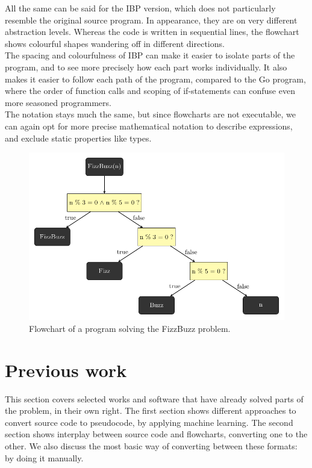 All the same can be said for the IBP version, which does not particularly resemble the original source program. In appearance, they are on very different abstraction levels. Whereas the code is written in sequential lines, the flowchart shows colourful shapes wandering off in different directions. \\

The spacing and colourfulness of IBP can make it easier to isolate parts of the program, and to see more precisely how each part works individually. It also makes it easier to follow each path of the program, compared to the Go program, where the order of function calls and scoping of if-statements can confuse even more seasoned programmers. \\

The notation stays much the same, but since flowcharts are not executable, we can again opt for more precise mathematical notation to describe expressions, and exclude static properties like types.

\begin{figure}[ht]
    \centering
    \includegraphics[scale=.75]{assets/chapter3/FizzBuzzTikZ.pdf}
    \caption{Flowchart of a program solving the FizzBuzz problem.}
    \label{FizzBuzzTikZ.}
\end{figure}

\section{Previous work}

This section covers selected works and software that have already solved parts of the problem, in their own right. The first section shows different approaches to convert source code to pseudocode, by applying machine learning. The second section shows interplay between source code and flowcharts, converting one to the other. We also discuss the most basic way of converting between these formats: by doing it manually.


